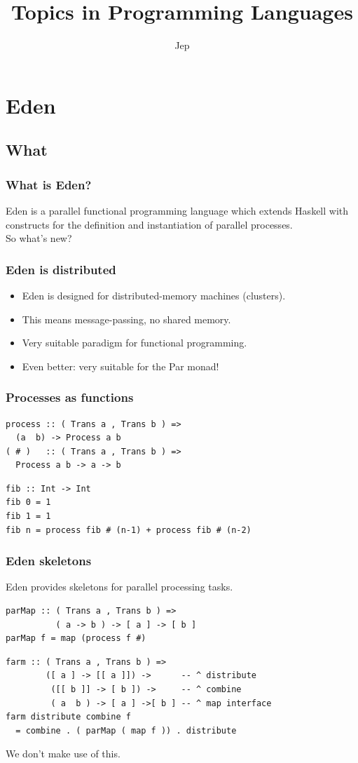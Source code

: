 \documentclass[12pt, danish]{beamer}
\title{Topics in Programming Languages}
\author{Jep}
\begin{document}
\begin{frame}
\titlepage
\end{frame}

\section{Eden}

\subsection{What}

\begin{frame}
\frametitle{What is Eden?}

Eden is a parallel functional programming language which extends
Haskell with constructs for the definition and instantiation of
parallel processes.\\
\pause
So what's new?
\end{frame}

\begin{frame}
\frametitle{Eden is distributed}

\begin{itemize}
\item Eden is designed for distributed-memory machines (clusters).\pause
\item This means message-passing, no shared memory.\pause
\item Very suitable paradigm for functional programming.\pause
\item Even better: very suitable for the Par monad!
\end{itemize}
\end{frame}

\begin{frame}[fragile]
\frametitle{Processes as functions}

\begin{verbatim}
process :: ( Trans a , Trans b ) =>
  (a  b) -> Process a b
( # )   :: ( Trans a , Trans b ) =>
  Process a b -> a -> b
\end{verbatim}
\pause
\begin{verbatim}
fib :: Int -> Int
fib 0 = 1
fib 1 = 1
fib n = process fib # (n-1) + process fib # (n-2)
\end{verbatim}
\end{frame}

\begin{frame}[fragile]
\frametitle{Eden skeletons}

Eden provides skeletons for parallel processing tasks.

\begin{verbatim}
parMap :: ( Trans a , Trans b ) =>
          ( a -> b ) -> [ a ] -> [ b ]
parMap f = map (process f #)
\end{verbatim}
\pause
\begin{verbatim}
farm :: ( Trans a , Trans b ) =>
        ([ a ] -> [[ a ]]) ->      -- ^ distribute
         ([[ b ]] -> [ b ]) ->     -- ^ combine
         ( a  b ) -> [ a ] ->[ b ] -- ^ map interface
farm distribute combine f
  = combine . ( parMap ( map f )) . distribute
\end{verbatim}
\pause
We don't make use of this.
\end{frame}
\end{document}
